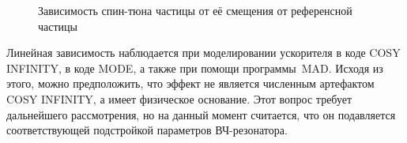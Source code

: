 \begin{figure}[H]\centering
	\caption{Зависимость спин-тюна частицы от её смещения от референсной частицы\label{fig:decoh:perfect}}
\end{figure}

Линейная зависимость наблюдается при моделировании ускорителя в коде COSY INFINITY, в коде MODE, 
а также при помощи программы MAD. 
Исходя из этого, можно предположить, что эффект не является численным артефактом COSY INFINITY,
а имеет физическое основание. Этот вопрос требует дальнейшего рассмотрения, 
но на данный момент считается, что он подавляется соответствующей подстройкой 
параметров ВЧ-резонатора.~\cite[стр.~210,~219]{Eremey:Thesis}


